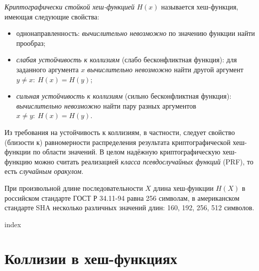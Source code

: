 \emph{Криптографически стойкой хеш-функцией} $H(x)$ называется хеш-функция, имеющая следующие свойства:
\begin{itemize}
    \item однонаправленность: \emph{вычислительно невозможно} по значению функции найти прообраз;
    \item \emph{слабая устойчивость к коллизиям} (слабо бесконфликтная функция): для заданного аргумента $x$ \emph{вычислительно невозможно} найти другой аргумент $y \neq x: ~ H(x) = H(y)$;
    \item \emph{сильная устойчивость к коллизиям} (сильно бесконфликтная функция): \emph{вычислительно невозможно} найти пару разных аргументов $x \neq y: ~ H(x) = H(y)$.
\end{itemize}

Из требования на устойчивость к коллизиям, в частности, следует свойство (близости к) равномерности распределения результата криптографической хеш-функции по области значений. В целом надёжную криптографическую хеш-функ\-цию можно считать реализацией \emph{класса псевдослучайных функций} (PRF), то есть \emph{случайным оракулом}.

При произвольной длине последовательности $X$ длина хеш-функции $H(X)$ в российском стандарте ГОСТ Р 34.11-94 равна 256 символам, в американском стандарте SHA несколько различных значений длин: 160, 192, 256, 512 символов.







{index}

\section{Коллизии в хеш-функциях}








